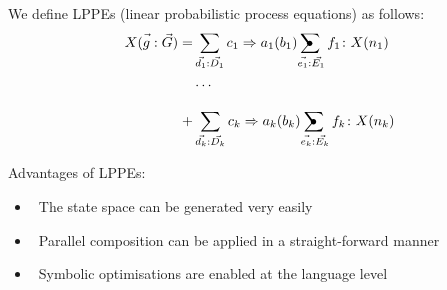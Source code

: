 \begin{block}{\large {}\vphantom{Introduction}}
We define \alert{LPPEs} (linear probabilistic process equations) as follows:
\vskip-25pt
\begin{align*}
X(\vec{g\vphantom{G}}:\vec{G}) = & \sum_{\vec{d_1} : \vec{D_1}} c_1 \Rightarrow a_1(b_1) \!\psum_{\vec{\vphantom{E}e_1} : \vec{E_1}} f_1 \colon X(n_1)\\
& \dots\\[10pt]
 + & \sum_{\vec{d_k} : \vec{D_k}} c_k \Rightarrow a_k(b_k) \!\psum_{\vec{\vphantom{E}e_k} : \vec{E_k}} f_k \colon X(n_k)
\end{align*}

\vskip40pt

Advantages of LPPEs:
\begin{adjustwidth}{0.5cm}{0.5cm}
\begin{itemize}
\item \ The \alert{state space} can be generated very easily
\item \ \alert{Parallel composition} can be applied in a straight-forward manner
\item \ \alert{Symbolic optimisations} are enabled at the language level
\end{itemize}
\end{adjustwidth}
\end{block}	